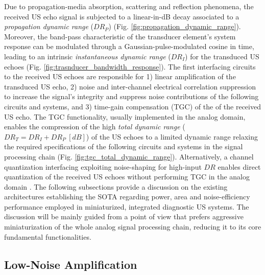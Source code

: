Due to propagation-media absorption, scattering and reflection phenomena, the received US echo signal is subjected to a linear-in-dB decay associated to a \textit{propagation dynamic range} ($DR_P$) (Fig. \ref{fig:propagation_dynamic_range}). Moreover, the band-pass characteristic of the transducer element's system response can be modulated through a Gaussian-pulse-modulated cosine in time, leading to an intrinsic \textit{instantaneous dynamic range} ($DR_I$) for the transduced US echoes (Fig. \ref{fig:trasnducer_bandwidth_response}). The first interfacing circuits to the received US echoes are responsible for 1) linear amplification of the transduced US echo, 2) noise and inter-channel electrical correlation suppression to increase the signal's integrity and suppress noise contributions of the following circuits and systems, and 3) time-gain compensation (TGC) of the of the received US echo. The TGC functionality, usually implemented in the analog domain, enables the compression of the high \textit{total dynamic range} ($DR_T = DR_I + DR_P \ [dB]$) of the US echoes to a limited dynamic range relaxing the required specifications of the following circuits and systems in the signal processing chain (Fig. \ref{fig:tgc_total_dynamic_range}).  Alternatively, a channel quantization interfacing exploiting noise-shaping for high-input $DR$ enables direct quantization of the received US echoes without performing TGC in the analog domain \cite{DirectQuantizationSensorToQuantizerWorks}.  The following subsections provide a discussion on the existing architectures establishing the SOTA regarding power, area and noise-efficiency performance employed in miniaturized, integrated diagnostic US systems. The discussion will be mainly guided from a point of view that prefers aggressive miniaturization of the whole analog signal processing chain, reducing it to its core fundamental functionalities. 

\subsection{Low-Noise Amplification}
\label{subsec:sub_array_beamforming_afes}

